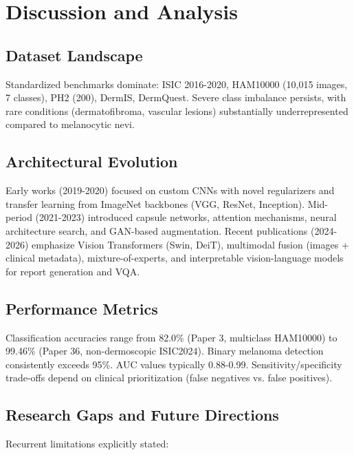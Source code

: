 \documentclass[conference]{IEEEtran}
\begin{document}
\section{Discussion and Analysis}

\subsection{Dataset Landscape}

Standardized benchmarks dominate: ISIC 2016-2020, HAM10000 (10,015 images, 7 classes), PH2 (200), DermIS, DermQuest. Severe class imbalance persists, with rare conditions (dermatofibroma, vascular lesions) substantially underrepresented compared to melanocytic nevi.

\subsection{Architectural Evolution}

Early works (2019-2020) focused on custom CNNs with novel regularizers and transfer learning from ImageNet backbones (VGG, ResNet, Inception). Mid-period (2021-2023) introduced capsule networks, attention mechanisms, neural architecture search, and GAN-based augmentation. Recent publications (2024-2026) emphasize Vision Transformers (Swin, DeiT), multimodal fusion (images + clinical metadata), mixture-of-experts, and interpretable vision-language models for report generation and VQA.

\subsection{Performance Metrics}

Classification accuracies range from 82.0\% (Paper 3, multiclass HAM10000) to 99.46\% (Paper 36, non-dermoscopic ISIC2024). Binary melanoma detection consistently exceeds 95\%. AUC values typically 0.88-0.99. Sensitivity/specificity trade-offs depend on clinical prioritization (false negatives vs. false positives).

\subsection{Research Gaps and Future Directions}

Recurrent limitations explicitly stated:
\end{document}
